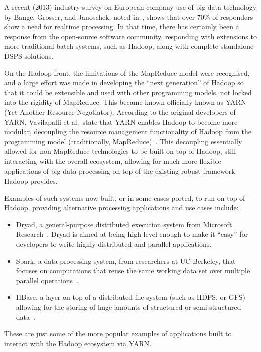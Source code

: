 \documentclass[a4paper,11pt]{article}
\begin{document}
A recent (2013) industry survey on European company use of big data technology by Bange, Grosser, and Janoschek, noted
in~\cite{industry_bd_survey}, shows that over 70\% of responders show a need for realtime processing. In that time,
there has certainly been a response from the open-source software community, responding with extensions to more
traditional batch systems, such as Hadoop, along with complete standalone DSPS solutions.

On the Hadoop front, the limitations of the MapReduce model were recognised, and a large effort was made in developing
the ``next generation'' of Hadoop so that it could be extensible and used with other programming models, not locked into
the rigidity of MapReduce. This became known officially known as YARN (Yet Another Resource Negotiator). According to
the original developers of YARN, Vavilapalli et al.\ state that YARN enables Hadoop to become more modular, decoupling
the resource management functionality of Hadoop from the programming model (traditionally, MapReduce)~\cite{vavilapalli2013apache}.
This decoupling essentially allowed for non-MapReduce technologies to be built on top of Hadoop, still interacting with the
overall ecosystem, allowing for much more flexible applications of big data processing on top of the existing robust
framework Hadoop provides.

Examples of such systems now built, or in some cases ported, to run on top of Hadoop, providing alternative processing
applications and use cases include:

\begin{itemize}
  \item Dryad, a general-purpose distributed execution system from Microsoft Research~\cite{isard2007dryad}. Dryad is
  aimed at being high level enough to make it ``easy'' for developers to write highly distributed and parallel applications.
  \item Spark, a data processing system, from researchers at UC Berkeley, that focuses on computations that reuse the same working data set over multiple
  parallel operations~\cite{zaharia2010spark}.
  \item HBase, a layer on top of a distributed file system (such as HDFS, or GFS) allowing for the storing of huge
  amounts of structured or semi-structured data~\cite{khetrapal2006hbase}.
\end{itemize}

These are just some of the more popular examples of applications built to interact with the Hadoop ecosystem via YARN.
\end{document}
